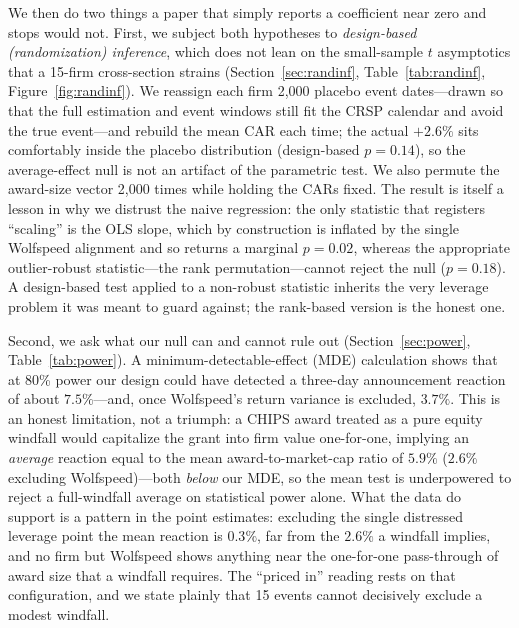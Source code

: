 \documentclass[12pt]{article}
\begin{document}
We then do two things a paper that simply reports a coefficient near zero and stops would
not. First, we subject both hypotheses to \emph{design-based (randomization) inference}, which
does not lean on the small-sample $t$ asymptotics that a 15-firm cross-section strains
(Section~\ref{sec:randinf}, Table~\ref{tab:randinf}, Figure~\ref{fig:randinf}). We reassign
each firm 2{,}000 placebo event dates---drawn so that the full estimation and event windows
still fit the CRSP calendar and avoid the true event---and rebuild the mean CAR each time; the
actual $+2.6\%$ sits comfortably inside the placebo distribution (design-based $p=0.14$), so the
average-effect null is not an artifact of the parametric test. We also permute the award-size
vector 2{,}000 times while holding the CARs fixed. The result is itself a lesson in why we
distrust the naive regression: the only statistic that registers ``scaling'' is the OLS slope,
which by construction is inflated by the single Wolfspeed alignment and so returns a marginal
$p=0.02$, whereas the appropriate outlier-robust statistic---the rank permutation---cannot reject
the null ($p=0.18$). A design-based test applied to a non-robust statistic inherits the very
leverage problem it was meant to guard against; the rank-based version is the honest one.

Second, we ask what our null can and cannot rule out
(Section~\ref{sec:power}, Table~\ref{tab:power}). A minimum-detectable-effect (MDE) calculation
shows that at 80\% power our design could have detected a three-day announcement reaction of
about $7.5\%$---and, once Wolfspeed's return variance is excluded, $3.7\%$. This is an honest
limitation, not a triumph: a CHIPS award treated as a pure equity windfall would capitalize the
grant into firm value one-for-one, implying an \emph{average} reaction equal to the mean
award-to-market-cap ratio of $5.9\%$ ($2.6\%$ excluding Wolfspeed)---both \emph{below} our MDE, so
the mean test is underpowered to reject a full-windfall average on statistical power alone. What
the data do support is a pattern in the point estimates: excluding the single distressed leverage
point the mean reaction is $0.3\%$, far from the $2.6\%$ a windfall implies, and no firm but
Wolfspeed shows anything near the one-for-one pass-through of award size that a windfall requires.
The ``priced in'' reading rests on that configuration, and we state plainly that 15 events cannot
decisively exclude a modest windfall.
\end{document}
